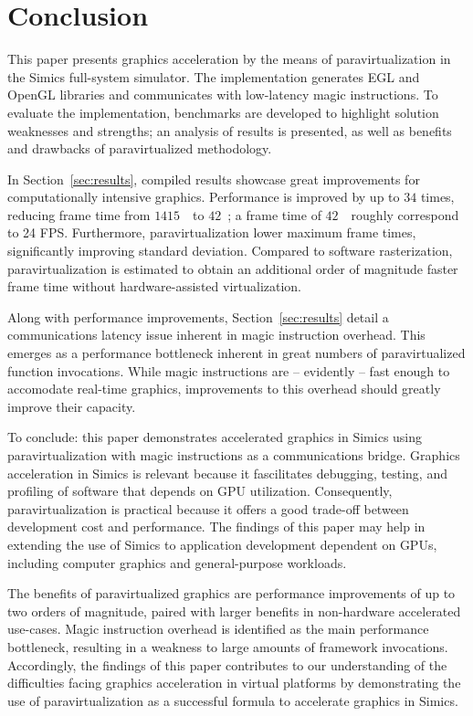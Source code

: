 \section{Conclusion}
\label{sec:conclusion}
This paper presents graphics acceleration by the means of paravirtualization in the Simics full-system simulator.
The implementation generates EGL and OpenGL libraries and communicates with low-latency magic instructions.
To evaluate the implementation, benchmarks are developed to highlight solution weaknesses and strengths; an analysis of results is presented, as well as benefits and drawbacks of paravirtualized methodology.

In Section~\ref{sec:results}, compiled results showcase great improvements for computationally intensive graphics.
Performance is improved by up to $34$ times, reducing frame time from $1415$~\milli\second\ to $42$~\milli\second ; a frame time of $42$~\milli\second\ roughly correspond to 24 FPS.
Furthermore, paravirtualization lower maximum frame times, significantly improving standard deviation.
Compared to software rasterization, paravirtualization is estimated to obtain an additional order of magnitude faster frame time without hardware-assisted virtualization.

Along with performance improvements, Section~\ref{sec:results} detail a communications latency issue inherent in magic instruction overhead.
This emerges as a performance bottleneck inherent in great numbers of paravirtualized function invocations.
While magic instructions are -- evidently -- fast enough to accomodate real-time graphics, improvements to this overhead should greatly improve their capacity.

To conclude: this paper demonstrates accelerated graphics in Simics using paravirtualization with magic instructions as a communications bridge.
Graphics acceleration in Simics is relevant because it fascilitates debugging, testing, and profiling of software that depends on GPU utilization.
Consequently, paravirtualization is practical because it offers a good trade-off between development cost and performance.
The findings of this paper may help in extending the use of Simics to application development dependent on GPUs, including computer graphics and general-purpose workloads.

The benefits of paravirtualized graphics are performance improvements of up to two orders of magnitude, paired with larger benefits in non-hardware accelerated use-cases.
Magic instruction overhead is identified as the main performance bottleneck, resulting in a weakness to large amounts of framework invocations.
Accordingly, the findings of this paper contributes to our understanding of the difficulties facing graphics acceleration in virtual platforms by demonstrating the use of paravirtualization as a successful formula to accelerate graphics in Simics.
